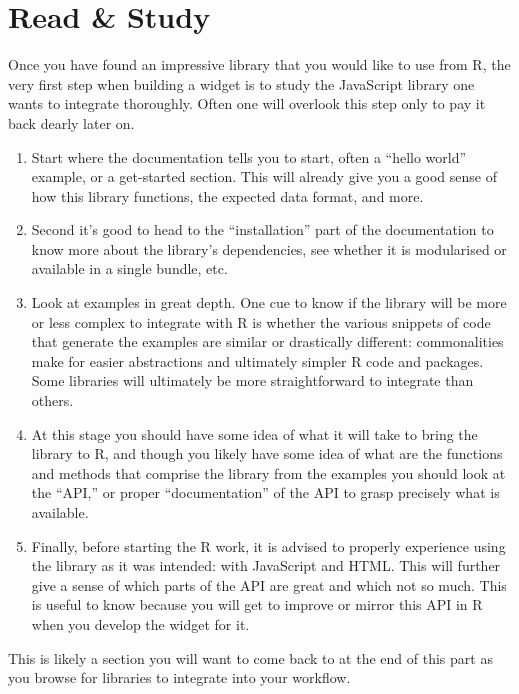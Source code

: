 \documentclass[10pt,]{krantz}
\providecommand{\tightlist}{%
  \setlength{\itemsep}{0pt}\setlength{\parskip}{0pt}}
\begin{document}
\hypertarget{widgets-basics-study}{%
\section{Read \& Study}\label{widgets-basics-study}}

Once you have found an impressive library that you would like to use from R, the very first step when building a widget is to study the JavaScript library one wants to integrate thoroughly. Often one will overlook this step only to pay it back dearly later on.

\begin{enumerate}
\def\labelenumi{\arabic{enumi}.}
\tightlist
\item
  Start where the documentation tells you to start, often a ``hello world'' example, or a get-started section. This will already give you a good sense of how this library functions, the expected data format, and more.
\item
  Second it's good to head to the ``installation'' part of the documentation to know more about the library's dependencies, see whether it is modularised or available in a single bundle, etc.
\item
  Look at examples in great depth. One cue to know if the library will be more or less complex to integrate with R is whether the various snippets of code that generate the examples are similar or drastically different: commonalities make for easier abstractions and ultimately simpler R code and packages. Some libraries will ultimately be more straightforward to integrate than others.
\item
  At this stage you should have some idea of what it will take to bring the library to R, and though you likely have some idea of what are the functions and methods that comprise the library from the examples you should look at the ``API,'' or proper ``documentation'' of the API to grasp precisely what is available.
\item
  Finally, before starting the R work, it is advised to properly experience using the library as it was intended: with JavaScript and HTML. This will further give a sense of which parts of the API are great and which not so much. This is useful to know because you will get to improve or mirror this API in R when you develop the widget for it.
\end{enumerate}

This is likely a section you will want to come back to at the end of this part as you browse for libraries to integrate into your workflow.
\end{document}
